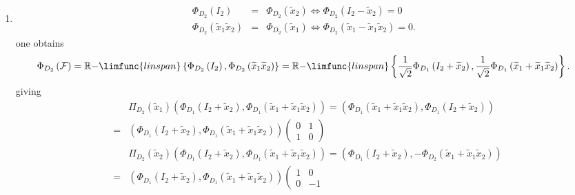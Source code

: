 \documentclass[aps,preprint]{revtex4}
\begin{document}
\begin{enumerate}
\item 
\begin{eqnarray}
\Phi _{D_{2}}\left( I_{2}\right) &=&\Phi _{D_{2}}\left( \widetilde{x}%
_{2}\right) \Leftrightarrow \Phi _{D_{2}}\left( I_{2}-\widetilde{x}%
_{2}\right) =0 \\
\Phi _{D_{2}}\left( \widetilde{x}_{1}\widetilde{x}_{2}\right) &=&\Phi
_{D_{2}}\left( \widetilde{x}_{1}\right) \Leftrightarrow \Phi _{D_{2}}\left( 
\widetilde{x}_{1}-\widetilde{x}_{1}\widetilde{x}_{2}\right) =0.
\end{eqnarray}%
one obtains%
\begin{equation}
\Phi _{D_{2}}\left( \mathcal{F}\right) =\mathbb{R-}\limfunc{linspan}\left\{
\Phi _{D_{2}}\left( I_{2}\right) ,\Phi _{D_{2}}\left( \widetilde{x}_{1}%
\widetilde{x}_{2}\right) \right\} =\mathbb{R-}\limfunc{linspan}\left\{ \frac{%
1}{\sqrt{2}}\Phi _{D_{1}}\left( I_{2}+\widetilde{x}_{2}\right) ,\frac{1}{%
\sqrt{2}}\Phi _{D_{1}}\left( \widetilde{x}_{1}+\widetilde{x}_{1}\widetilde{x}%
_{2}\right) \right\} .
\end{equation}%
giving%
\begin{eqnarray}
&&\Pi _{D_{2}}\left( \widetilde{x}_{1}\right) \left( \Phi _{D_{1}}\left(
I_{2}+\widetilde{x}_{2}\right) ,\Phi _{D_{1}}\left( \widetilde{x}_{1}+%
\widetilde{x}_{1}\widetilde{x}_{2}\right) \right) =\left( \Phi
_{D_{1}}\left( \widetilde{x}_{1}+\widetilde{x}_{1}\widetilde{x}_{2}\right)
,\Phi _{D_{1}}\left( I_{2}+\widetilde{x}_{2}\right) \right) \\
&=&\left( \Phi _{D_{1}}\left( I_{2}+\widetilde{x}_{2}\right) ,\Phi
_{D_{1}}\left( \widetilde{x}_{1}+\widetilde{x}_{1}\widetilde{x}_{2}\right)
\right) \left( 
\begin{array}{cc}
0 & 1 \\ 
1 & 0%
\end{array}%
\right) \\
&&\Pi _{D_{2}}\left( \widetilde{x}_{2}\right) \left( \Phi _{D_{1}}\left(
I_{2}+\widetilde{x}_{2}\right) ,\Phi _{D_{1}}\left( \widetilde{x}_{1}+%
\widetilde{x}_{1}\widetilde{x}_{2}\right) \right) =\left( \Phi
_{D_{1}}\left( I_{2}+\widetilde{x}_{2}\right) ,-\Phi _{D_{2}}\left( 
\widetilde{x}_{1}+\widetilde{x}_{1}\widetilde{x}_{2}\right) \right) \\
&=&\left( \Phi _{D_{1}}\left( I_{2}+\widetilde{x}_{2}\right) ,\Phi
_{D_{1}}\left( \widetilde{x}_{1}+\widetilde{x}_{1}\widetilde{x}_{2}\right)
\right) \left( 
\begin{array}{cc}
1 & 0 \\ 
0 & -1%
\end{array}%

\end{eqnarray}
\end{enumerate}
\end{document}
